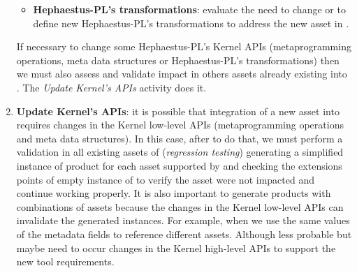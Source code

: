 \begin{enumerate}
\begin{itemize}
  \item \textbf{Hephaestus-PL's transformations}: evaluate the need to change or to define new Hephaestus-PL's transformations to address the new asset in \hpl.
  
\end{itemize}  

If necessary to change some Hephaestus-PL's Kernel APIs (metaprogramming operations, meta data structures or Hephaestus-PL's transformations) then we must also assess and validate impact in others assets already existing into \hpl. The \textit{Update Kernel's APIs} activity does it.  
  
   \item \textbf{Update Kernel's APIs}: it is possible that integration of a new asset into \hpl{} requires changes in the Kernel low-level APIs (metaprogramming operations and meta data structures). In this case, after to do that, we must perform a validation in all existing assets of \hpl{} (\textit{regression testing}) generating a simplified instance of \hp{} product for each asset supported by \hpl{} and checking the extensions points of empty instance of \hp{} to verify the asset were not impacted and continue working properly. It is also important to generate products with combinations of assets because the changes in the Kernel low-level APIs can invalidate the generated \hpl{} instances. For example, when we use the same values of the metadata fields to reference different assets.
Although less probable but maybe need to occur changes in the Kernel high-level APIs to support the new tool requirements.

\end{enumerate}
